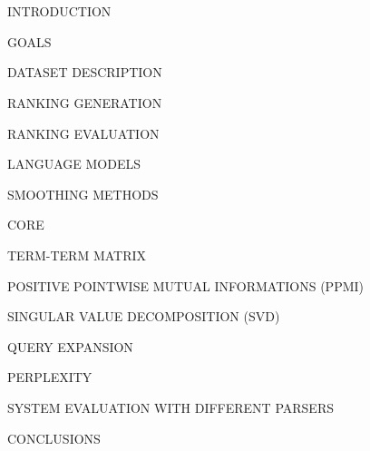 \section{}
\begin{frame}{INTRODUCTION}
    
\end{frame}

\begin{frame}{GOALS}
    
\end{frame}

\begin{frame}{DATASET DESCRIPTION}
    
\end{frame}

\begin{frame}{RANKING GENERATION}
    
\end{frame}

\begin{frame}{RANKING EVALUATION}
    
\end{frame}

\begin{frame}{LANGUAGE MODELS}
    
\end{frame}

\begin{frame}{SMOOTHING METHODS}
    
\end{frame}

\begin{frame}{CORE}
    
\end{frame}

\begin{frame}{TERM-TERM MATRIX}
    
\end{frame}

\begin{frame}{POSITIVE POINTWISE MUTUAL INFORMATIONS (PPMI)}
    
\end{frame}

\begin{frame}{SINGULAR VALUE DECOMPOSITION (SVD)}
    
\end{frame}

\begin{frame}{QUERY EXPANSION}
    
\end{frame}

\begin{frame}{PERPLEXITY}
    
\end{frame}

\begin{frame}{SYSTEM EVALUATION WITH DIFFERENT PARSERS}
    
\end{frame}

\begin{frame}{CONCLUSIONS}
    
\end{frame}







